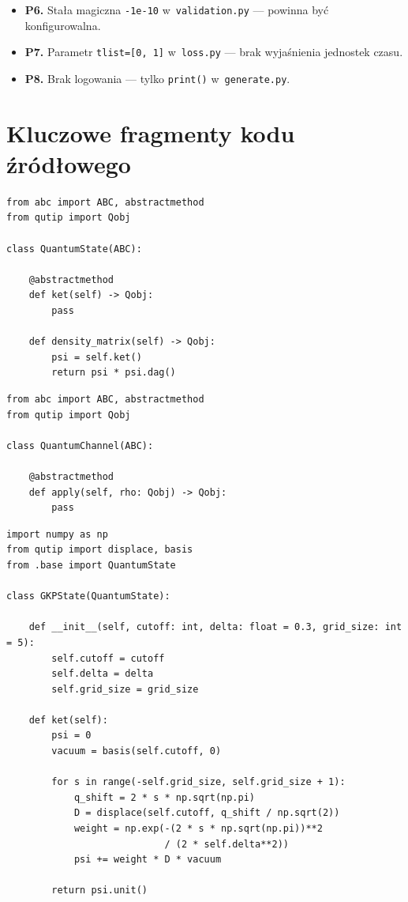 \documentclass[12pt,a4paper]{article}
\begin{document}
\begin{itemize}
    \item \textbf{P6.} Stała magiczna \texttt{-1e-10} w~\texttt{validation.py} --- powinna być konfigurowalna.
    \item \textbf{P7.} Parametr \texttt{tlist=[0, 1]} w~\texttt{loss.py} --- brak wyjaśnienia jednostek czasu.
    \item \textbf{P8.} Brak logowania --- tylko \texttt{print()} w~\texttt{generate.py}.
\end{itemize}

\section{Kluczowe fragmenty kodu źródłowego}
\label{sec:kod}

\begin{lstlisting}[caption={Klasa bazowa stanów kwantowych (\texttt{state/base.py}).}, label={lst:base-state}]
from abc import ABC, abstractmethod
from qutip import Qobj

class QuantumState(ABC):

    @abstractmethod
    def ket(self) -> Qobj:
        pass

    def density_matrix(self) -> Qobj:
        psi = self.ket()
        return psi * psi.dag()
\end{lstlisting}

\begin{lstlisting}[caption={Klasa bazowa kanałów kwantowych (\texttt{noise/base.py}).}, label={lst:base-channel}]
from abc import ABC, abstractmethod
from qutip import Qobj

class QuantumChannel(ABC):

    @abstractmethod
    def apply(self, rho: Qobj) -> Qobj:
        pass
\end{lstlisting}

\begin{lstlisting}[caption={Implementacja stanu GKP (\texttt{state/gkp.py}).}, label={lst:gkp}]
import numpy as np
from qutip import displace, basis
from .base import QuantumState

class GKPState(QuantumState):

    def __init__(self, cutoff: int, delta: float = 0.3, grid_size: int = 5):
        self.cutoff = cutoff
        self.delta = delta
        self.grid_size = grid_size

    def ket(self):
        psi = 0
        vacuum = basis(self.cutoff, 0)

        for s in range(-self.grid_size, self.grid_size + 1):
            q_shift = 2 * s * np.sqrt(np.pi)
            D = displace(self.cutoff, q_shift / np.sqrt(2))
            weight = np.exp(-(2 * s * np.sqrt(np.pi))**2
                            / (2 * self.delta**2))
            psi += weight * D * vacuum

        return psi.unit()
\end{lstlisting}
\end{document}

